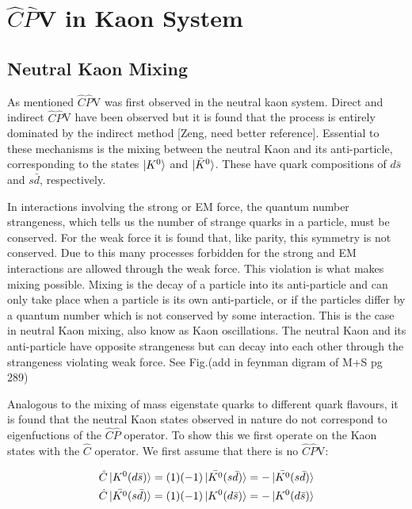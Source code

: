 \section{$\hat{C}\hat{P}$V in Kaon System} 

\subsection{Neutral Kaon Mixing}

As mentioned $\hat{C}\hat{P}$V was first observed in the neutral kaon system. Direct and indirect $\hat{C}\hat{P}$V have been observed but it is found that the process is entirely dominated by the indirect method [Zeng, need better reference]. Essential to these mechanisms is the mixing between the neutral Kaon and its anti-particle, corresponding to the states $\ket{K^{0}}$ and $\ket{\bar{K}^{0}}$. These have quark compositions of $d \bar{s}$ and $s \bar{d}$, respectively. 

In interactions involving the strong or EM force, the quantum number strangeness, which tells us the number of strange quarks in a particle, must be conserved. For the weak force it is found that, like parity, this symmetry is not conserved. Due to this many processes forbidden for the strong and EM interactions are allowed through the weak force. This violation is what makes mixing possible. Mixing is the decay of a particle into its anti-particle and can only take place when a particle is its own anti-particle, or if the particles differ by a quantum number which is not conserved by some interaction. This is the case in neutral Kaon mixing, also know as Kaon oscillations. The neutral Kaon and its anti-particle have opposite strangeness but can decay into each other through the strangeness violating weak force. See Fig.(add in feynman digram of M+S pg 289) 

Analogous to the mixing of mass eigenstate quarks to different quark flavours, it is found that the neutral Kaon states observed in nature do not correspond to eigenfuctions of the $\hat{C}\hat{P}$ operator. To show this we first operate on the Kaon states with the $\hat{C}$ operator. We first assume that there is no $\hat{C}\hat{P}$V:

\begin{align*}
\hat{C} \ket{K^{0}(d \bar{s})} = (1)(-1) \ket{\bar{K^{0}}(s \bar{d})} = - \ket{\bar{K^{0}}(s \bar{d})}  \\
\hat{C} \ket{\bar{K^{0}}(s \bar{d})} = (1)(-1) \ket{K^{0}(d \bar{s})} = - \ket{K^{0}(d \bar{s})}  
\end{align*}

